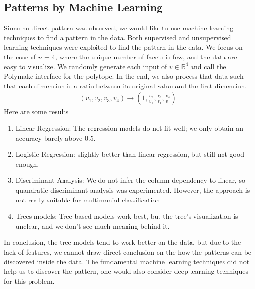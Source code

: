 \documentclass[12pt,letterpaper]{article}
\newcommand*{\R}{\mathbb{R}}
\begin{document}
\subsection{Patterns by Machine Learning}
Since no direct pattern was observed, we would like to use machine learning techniques to find a pattern in the data.
Both supervised and unsupervised learning techniques were exploited to find the pattern in the data. 
We focus on the case of $n = 4$, where the unique number of facets is few, and the data are easy to visualize.
We randomly generate each input of $v \in \R^4$ and call the Polymake interface for the polytope. In the end, 
we also process that data such that each dimension is a ratio between its original value and the first dimension. 
\begin{align*}
 (v_1, v_2, v_3, v_4) \rightarrow \left(1, \frac{v_2}{v_1}, \frac{v_3}{v_1}, \frac{v_4}{v_1} \right)
\end{align*}
Here are some results
\begin{enumerate}
    \item Linear Regression: The regression models do not fit well; we only obtain an accuracy barely above $0.5$.
    \item Logistic Regression: slightly better than linear regression, but still not good enough.
    \item Discriminant Analysis: We do not infer the column dependency to linear, so quandratic discriminant analysis was experimented.
    However, the approach is not really suitable for multimonial classification.
    \item Trees models: Tree-based models work best, but the tree's visualization is unclear, and we don't see much meaning behind it.
\end{enumerate}
In conclusion, the tree models tend to work better on the data, but due to the lack of features,
we cannot draw direct conclusion on the how the patterns can be discovered inside the data.
The fundamental machine learning techniques did not help us to discover the pattern, one 
would also consider deep learning techniques for this problem.
\end{document}
